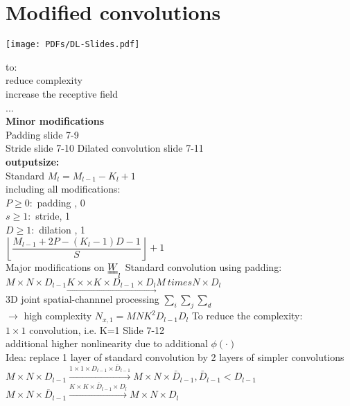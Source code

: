 \section{Modified convolutions}
\texttt{[image: PDFs/DL-Slides.pdf]}

to:\\
\textbullet reduce complexity \\
\textbullet increase the receptive field\\
\textbullet ... \\
\textbf{Minor modifications }\\
\textbullet Padding slide 7-9 \\
\textbullet Stride slide 7-10  
\textbullet Dilated convolution slide 7-11\\
\textbf{outputsize:} \\
Standard $ M_l = M_{l-1 } - K_l + 1   $\\
including all modifications:\\
$ P \geq 0:  $ padding , 0 \\
$ s \geq 1:  $ stride, 1 \\
$ D\geq 1 :  $ dilation , 1 \\
$ \left\lfloor \dfrac{M_{l-1} + 2P - (K_l -1) D-1}{S} \right\rfloor +1 $\\
Major modifications on $ \W_l $
\textbullet Standard convolution using padding:\\
$  M \times N \times D_{l-1} \underset{\rightarrow}{K \times \times K \times D_{l-1} \times D_l}  M \ times N \times D_l$ \\
3D joint spatial-channnel processing $  \sum_i \sum _j \sum_d  $\\
$ \rightarrow $ high complexity $  N_{x,1} = MNK^2 D_{l-1 } D_l  $
To reduce the complexity:\\
\textbullet $  1 \times 1  $ convolution, i.e. K=1 Slide 7-12\\
\textbullet additional higher nonlinearity due to additional $ \phi(\cdot) $\\
Idea: replace 1 layer of standard convolution by 2 layers of simpler convolutions\\
\textbullet $ M \times N \times D_{l-1 } \overset{1 \times 1 \times D_{l-1 } \times \bar{D} _{l-1 } }{\longrightarrow} M \times N \times \bar{D}_{l-1 } , \bar{D}_{l-1} < D_{l-1 }$\\
\textbullet $  M \times N \times \bar{D}_{l-1 } \overset{K \times K \times \bar{D}_{l-1 } \times D_l}{\longrightarrow} M \times N \times D_l $

